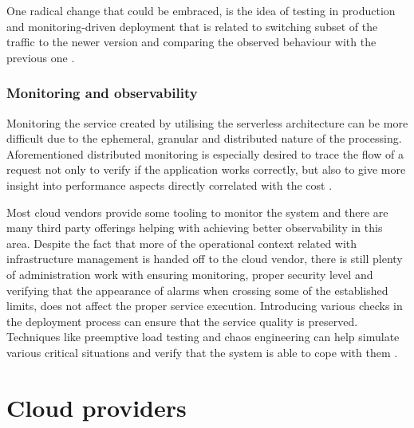 One radical change that could be embraced, is the idea of testing in production and monitoring-driven deployment that is related to switching subset of the traffic to the newer version and comparing the observed behaviour with the previous one \cite{MartinFowlerServerless}.

\subsubsection{Monitoring and observability} \label{chapter:serverless-monitoring-and-observability}

Monitoring the service created by utilising the serverless architecture can be more difficult due to the ephemeral, granular and distributed nature of the processing. Aforementioned distributed monitoring is especially desired to trace the flow of a request not only to verify if the application works correctly, but also to give more insight into performance aspects directly correlated with the cost \cite{LeveragingServerlessCloudComputingArchitectures}.

Most cloud vendors provide some tooling to monitor the system and there are many third party offerings helping with achieving better observability in this area. Despite the fact that more of the operational context related with infrastructure management is handed off to the cloud vendor, there is still plenty of administration work with ensuring monitoring, proper security level and verifying that the appearance of alarms when crossing some of the established limits, does not affect the proper service execution. Introducing various checks in the deployment process can ensure that the service quality is preserved. Techniques like preemptive load testing and chaos engineering can help simulate various critical situations and verify that the system is able to cope with them \cite{MartinFowlerServerless}.

\section{Cloud providers} \label{chapter:serverless-service-providers}

